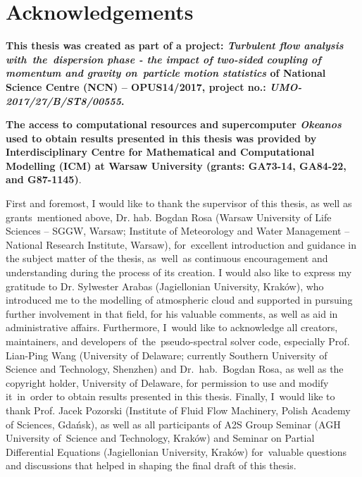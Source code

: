 \documentclass{pracamgren}
\begin{document}
\begin{abstract}
\end{abstract}


\tableofcontents


\chapter*{Acknowledgements}
\label{ch:ack}

\textbf{This thesis was created as part of a project: \emph{Turbulent flow analysis with~the~dispersion phase - the impact of two-sided coupling of momentum and gravity on~particle motion statistics} of National Science Centre (NCN) -- OPUS14/2017, project no.: \emph{UMO-2017/27/B/ST8/00555}.}

\smallskip
\noindent 
\textbf{The access to computational resources and supercomputer \emph{Okeanos} used to obtain results presented in this thesis was provided by Interdisciplinary Centre for Mathematical and Computational Modelling (ICM) at Warsaw University (grants: GA73-14, GA84-22, and G87-1145)}.

\bigskip

First and foremost, I would like to thank the supervisor of this thesis, as well as grants~mentioned above, Dr. hab. Bogdan Rosa (Warsaw University of Life Sciences -- SGGW, Warsaw; Institute of Meteorology and Water Management -- National Research Institute, Warsaw), for~excellent introduction and guidance in the subject matter of the thesis, as~well~as continuous encouragement and understanding during the process of its creation.
I would also like to express my gratitude to Dr. Sylwester Arabas (Jagiellonian University, Kraków), who introduced me to the modelling of atmospheric cloud and supported in pursuing further involvement in that field, for his valuable comments, as well as aid in administrative affairs.
Furthermore, I~would like to acknowledge all creators, maintainers, and developers of~the~pseudo-spectral solver code, especially Prof. Lian-Ping Wang (University of Delaware; currently Southern University of Science and Technology, Shenzhen) and Dr.~hab.~Bogdan Rosa, as well as the copyright holder, University of Delaware, for permission to use and modify it~in~order to obtain results presented in this thesis.
Finally, I~would like to thank Prof. Jacek Pozorski (Institute of Fluid Flow Machinery, Polish Academy of Sciences, Gdańsk), as well as all participants of A2S Group Seminar (AGH University of~Science and Technology, Kraków) and Seminar on Partial Differential Equations (Jagiellonian University, Kraków) for~valuable questions and discussions that helped in shaping the final draft of this thesis. 
\end{document}
